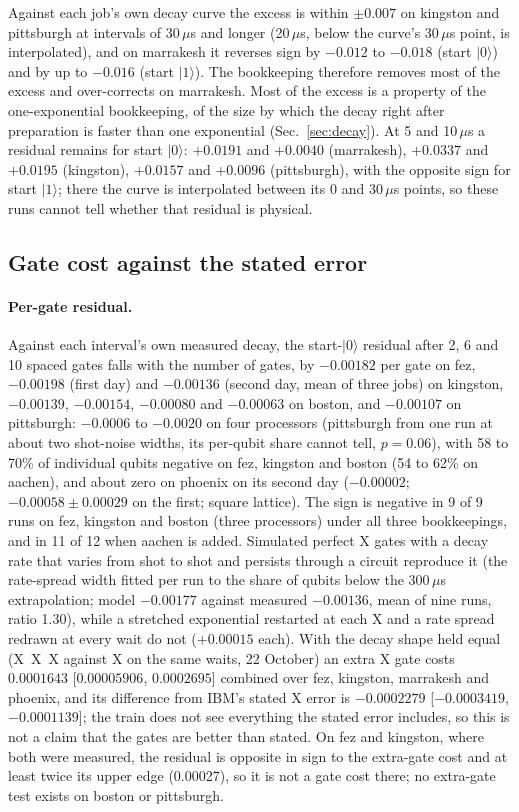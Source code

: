 \documentclass[reprint,amsmath,amssymb,aps,superscriptaddress,nofootinbib]{revtex4-2}
\newcommand{\us}{\,$\mu$s}
\begin{document}
Against each job's own decay curve the excess is within $\pm0.007$ on kingston and pittsburgh at intervals of 30\us{} and longer (20\us{}, below the curve's 30\us{} point, is interpolated), and on marrakesh it reverses sign by $-0.012$ to $-0.018$ (start $|0\rangle$) and by up to $-0.016$ (start $|1\rangle$). The bookkeeping therefore removes most of the excess and over-corrects on marrakesh. Most of the excess is a property of the one-exponential bookkeeping, of the size by which the decay right after preparation is faster than one exponential (Sec.~\ref{sec:decay}). At 5 and 10\us{} a residual remains for start $|0\rangle$: $+0.0191$ and $+0.0040$ (marrakesh), $+0.0337$ and $+0.0195$ (kingston), $+0.0157$ and $+0.0096$ (pittsburgh), with the opposite sign for start $|1\rangle$; there the curve is interpolated between its 0 and 30\us{} points, so these runs cannot tell whether that residual is physical.

\subsection{Gate cost against the stated error}\label{sec:gate}

\paragraph*{Per-gate residual.} Against each interval's own measured decay, the start-$|0\rangle$ residual after 2, 6 and 10 spaced gates falls with the number of gates, by $-0.00182$ per gate on fez, $-0.00198$ (first day) and $-0.00136$ (second day, mean of three jobs) on kingston, $-0.00139$, $-0.00154$, $-0.00080$ and $-0.00063$ on boston, and $-0.00107$ on pittsburgh: $-0.0006$ to $-0.0020$ on four processors (pittsburgh from one run at about two shot-noise widths, its per-qubit share cannot tell, $p=0.06$), with 58 to 70\% of individual qubits negative on fez, kingston and boston (54 to 62\% on aachen), and about zero on phoenix on its second day ($-0.00002$; $-0.00058\pm0.00029$ on the first; square lattice). The sign is negative in 9 of 9 runs on fez, kingston and boston (three processors) under all three bookkeepings, and in 11 of 12 when aachen is added. Simulated perfect X gates with a decay rate that varies from shot to shot and persists through a circuit reproduce it (the rate-spread width fitted per run to the share of qubits below the 300\us{} extrapolation; model $-0.00177$ against measured $-0.00136$, mean of nine runs, ratio 1.30), while a stretched exponential restarted at each X and a rate spread redrawn at every wait do not ($+0.00015$ each). With the decay shape held equal (X~X~X against X on the same waits, 22 October) an extra X gate costs $0.0001643$ [$0.00005906$, $0.0002695$] combined over fez, kingston, marrakesh and phoenix, and its difference from IBM's stated X error is $-0.0002279$ [$-0.0003419$, $-0.0001139$]; the train does not see everything the stated error includes, so this is not a claim that the gates are better than stated. On fez and kingston, where both were measured, the residual is opposite in sign to the extra-gate cost and at least twice its upper edge (0.00027), so it is not a gate cost there; no extra-gate test exists on boston or pittsburgh.
\end{document}
